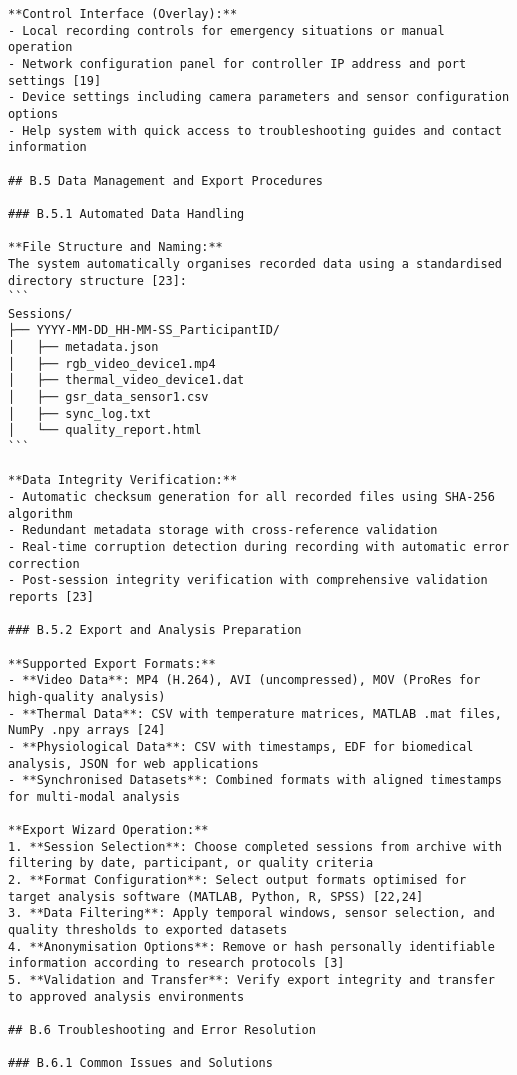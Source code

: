 \begin{verbatim}
**Control Interface (Overlay):**
- Local recording controls for emergency situations or manual operation
- Network configuration panel for controller IP address and port settings [19]
- Device settings including camera parameters and sensor configuration options
- Help system with quick access to troubleshooting guides and contact information

## B.5 Data Management and Export Procedures

### B.5.1 Automated Data Handling

**File Structure and Naming:**
The system automatically organises recorded data using a standardised directory structure [23]:
```
Sessions/
├── YYYY-MM-DD_HH-MM-SS_ParticipantID/
│   ├── metadata.json
│   ├── rgb_video_device1.mp4
│   ├── thermal_video_device1.dat
│   ├── gsr_data_sensor1.csv
│   ├── sync_log.txt
│   └── quality_report.html
```

**Data Integrity Verification:**
- Automatic checksum generation for all recorded files using SHA-256 algorithm
- Redundant metadata storage with cross-reference validation
- Real-time corruption detection during recording with automatic error correction
- Post-session integrity verification with comprehensive validation reports [23]

### B.5.2 Export and Analysis Preparation

**Supported Export Formats:**
- **Video Data**: MP4 (H.264), AVI (uncompressed), MOV (ProRes for high-quality analysis)
- **Thermal Data**: CSV with temperature matrices, MATLAB .mat files, NumPy .npy arrays [24]
- **Physiological Data**: CSV with timestamps, EDF for biomedical analysis, JSON for web applications
- **Synchronised Datasets**: Combined formats with aligned timestamps for multi-modal analysis

**Export Wizard Operation:**
1. **Session Selection**: Choose completed sessions from archive with filtering by date, participant, or quality criteria
2. **Format Configuration**: Select output formats optimised for target analysis software (MATLAB, Python, R, SPSS) [22,24]
3. **Data Filtering**: Apply temporal windows, sensor selection, and quality thresholds to exported datasets
4. **Anonymisation Options**: Remove or hash personally identifiable information according to research protocols [3]
5. **Validation and Transfer**: Verify export integrity and transfer to approved analysis environments

## B.6 Troubleshooting and Error Resolution

### B.6.1 Common Issues and Solutions


\end{verbatim}
